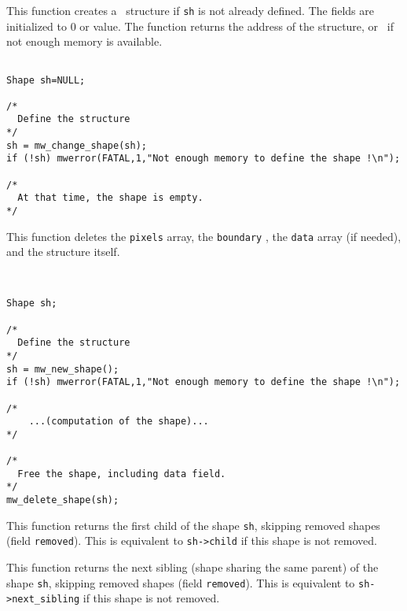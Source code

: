 \Description
This function creates a \shape\ structure if \verb+sh+ is not
already defined. 
The fields are initialized to $0$ or \Null value.
The function returns the address of the structure, or
\Null\ if not enough memory is available.

\Next
\Example
\begin{verbatim}

Shape sh=NULL;

/*
  Define the structure
*/
sh = mw_change_shape(sh);
if (!sh) mwerror(FATAL,1,"Not enough memory to define the shape !\n");

/* 
  At that time, the shape is empty.
*/
\end{verbatim}

\newpage %


\Description
This function deletes the \verb+pixels+ array, the \verb+boundary+ \flist,
the \verb+data+ array (if needed), and the structure itself.

\Next
\Example
\begin{verbatim}


Shape sh;

/*
  Define the structure
*/
sh = mw_new_shape();
if (!sh) mwerror(FATAL,1,"Not enough memory to define the shape !\n");

/*
    ...(computation of the shape)...
*/

/* 
  Free the shape, including data field. 
*/
mw_delete_shape(sh);

\end{verbatim}

\newpage %
\Description
This function returns the first child of the shape \verb+sh+, skipping
removed shapes (field \verb+removed+). This is equivalent to
\verb+sh->child+ if this shape is not removed.

\newpage %


\Description
This function returns the next sibling (shape sharing the same parent) of
the shape \verb+sh+, skipping removed shapes (field \verb+removed+). This
is equivalent to \verb+sh->next_sibling+ if this shape is not removed.


